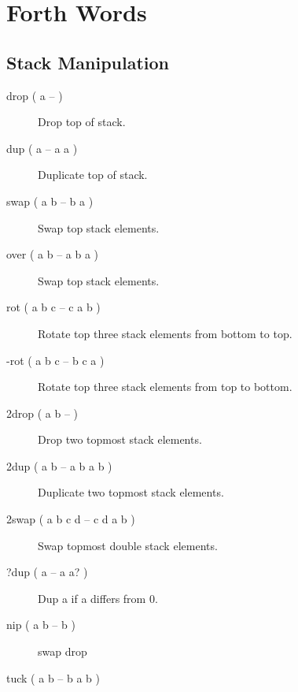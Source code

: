 \chapter{Forth Words}

\section{Stack Manipulation}

\begin{description}


\item[drop ( a -- )]

Drop top of stack.

\item[dup ( a -- a a )]

Duplicate top of stack.

\item[swap ( a b -- b a )]

Swap top stack elements.

\item[over ( a b -- a b a )]

Swap top stack elements.

\item[rot ( a b c -- c a b )]

Rotate top three stack elements from bottom to top.

\item[-rot ( a b c -- b c a )]

Rotate top three stack elements from top to bottom.

\item[2drop ( a b -- )]

Drop two topmost stack elements.

\item[2dup ( a b -- a b a b )]

Duplicate two topmost stack elements.

\item[2swap ( a b c d -- c d a b )]

Swap topmost double stack elements.

\item[?dup ( a -- a a? )]

Dup a if a differs from 0.

\item[nip ( a b -- b )]

swap drop

\item[tuck ( a b -- b a b )]


\end{description}
